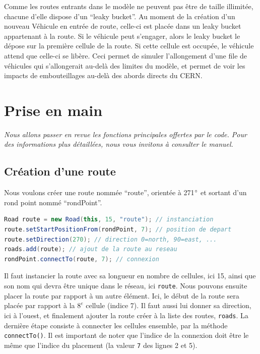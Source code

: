 \documentclass[a4paper,11pt, titlepage]{extarticle}
\begin{document}
Comme les routes entrants dans le modèle ne peuvent pas être de taille illimitée, chacune d'elle dispose d'un ``leaky bucket''. Au moment de la création d'un nouveau Véhicule en entrée de route, celle-ci est placée dans un leaky bucket appartenant à la route. Si le véhicule peut s'engager, alors le leaky bucket le dépose sur la première cellule de la route. Si cette cellule est occupée, le véhicule attend que celle-ci se libère. Ceci permet de simuler l'allongement d'une file de véhicules qui s'allongerait au-delà des limites du modèle, et permet de voir les impacts de embouteillages au-delà des abords directs du CERN.

\newpage

\section{Prise en main}

\emph{Nous allons passer en revue les fonctions principales offertes par le code. Pour des informations plus détaillées, nous vous invitons à consulter le manuel.}\newline

\subsection{Création d'une route}

Nous voulons créer une route nommée ``route'', orientée à 271$\degree$ et sortant d'un rond point nommé ``rondPoint''.

\begin{lstlisting}[language=Java]
Road route = new Road(this, 15, "route"); // instanciation
route.setStartPositionFrom(rondPoint, 7); // position de depart
route.setDirection(270); // direction 0=north, 90=east, ...
roads.add(route); // ajout de la route au reseau
rondPoint.connectTo(route, 7); // connexion
\end{lstlisting}

Il faut instancier la route avec sa longueur en nombre de cellules, ici 15, ainsi que son nom qui devra être unique dans le réseau, ici \texttt{route}. Nous pouvons ensuite placer la route par rapport à un autre élément. Ici, le début de la route sera placée par rapport à la $8^e$ cellule (indice 7). Il faut aussi lui donner sa direction, ici à l'ouest, et finalement ajouter la route créer à la liste des routes, \texttt{roads}. La dernière étape consiste à connecter les cellules ensemble, par la méthode \texttt{connectTo()}. Il est important de noter que l'indice de la connexion doit être le même que l'indice du placement (la valeur \texttt{7} des lignes 2 et 5).
\end{document}

